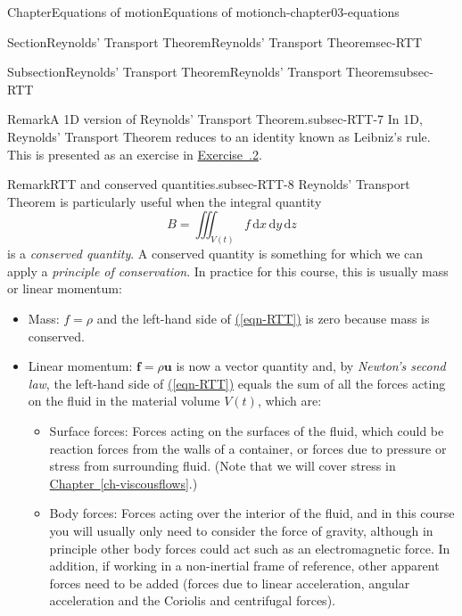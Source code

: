 \documentclass[oneside,10pt,]{book}
\newcommand{\xreffont}{\relax}
\newcommand{\ptxlistdisc}{\raisebox{0.3ex}{\textbullet}}
\newcommand{\ptxlistcircle}{\raisebox{0.3ex}{\textopenbullet}}
\numberwithin{equation}{section}
\newcommand{\de}{\mathrm{d}}
\newcommand{\bu}{\boldsymbol{u}}
\renewcommand{\bf}{\boldsymbol{f}}
\begin{document}
\begin{chapterptx}{Chapter}{Equations of motion}{}{Equations of motion}{}{}{ch-chapter03-equations}
\begin{sectionptx}{Section}{Reynolds' Transport Theorem}{}{Reynolds' Transport Theorem}{}{}{sec-RTT}
\begin{subsectionptx}{Subsection}{Reynolds' Transport Theorem}{}{Reynolds' Transport Theorem}{}{}{subsec-RTT}
\begin{remark}{Remark}{A 1D version of Reynolds' Transport Theorem.}{subsec-RTT-7}
In 1D, Reynolds' Transport Theorem reduces to an identity known as Leibniz's rule. This is presented as an exercise in \hyperlink{ex-hw-leibnitz-rule}{Exercise~{\xreffont 3.6.2}}.%
\end{remark}
\begin{remark}{Remark}{RTT and conserved quantities.}{subsec-RTT-8}%
Reynolds' Transport Theorem is particularly useful when the integral quantity%
\begin{equation*}
B = \iiint_{V(t)} f \, \de{x} \, \de{y} \, \de{z}
\end{equation*}
is a \emph{conserved quantity}. A conserved quantity is something for which we can apply a \emph{principle of conservation}. In practice for this course, this is usually mass or linear momentum:%
\begin{itemize}[label=\ptxlistdisc]
\item{}Mass: \(f=\rho\) and the left-hand side of \hyperref[eqn-RTT]{({\xreffont\ref{eqn-RTT}})} is zero because mass is conserved.%
\item{}Linear momentum: \(\bf=\rho\bu\) is now a vector quantity and, by \emph{Newton's second law}, the left-hand side of \hyperref[eqn-RTT]{({\xreffont\ref{eqn-RTT}})} equals the sum of all the forces acting on the fluid in the material volume \(V(t)\), which are:%
\begin{itemize}[label=\ptxlistcircle]
\item{}Surface forces: Forces acting on the surfaces of the fluid, which could be reaction forces from the walls of a container, or forces due to pressure or stress from surrounding fluid. (Note that we will cover stress in \hyperref[ch-viscousflows]{Chapter~{\xreffont\ref{ch-viscousflows}}}.)%
\item{}Body forces: Forces acting over the interior of the fluid, and in this course you will usually only need to consider the force of gravity, although in principle other body forces could act such as an electromagnetic force. In addition, if working in a non-inertial frame of reference, other apparent forces need to be added (forces due to linear acceleration, angular acceleration and the Coriolis and centrifugal forces).%
\end{itemize}
%
\end{itemize}
%
\end{remark}
\end{subsectionptx}
\end{sectionptx}
%
%
\typeout{************************************************}

\end{chapterptx}
\end{document}
